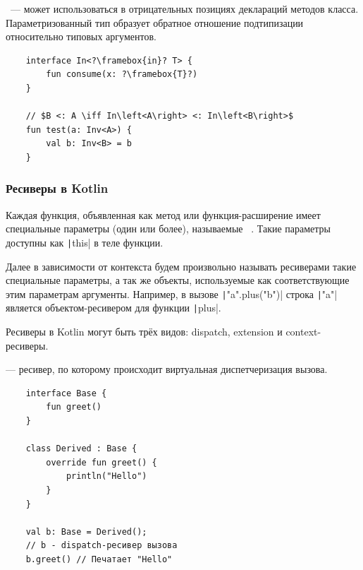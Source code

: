 \begin{definition}
    \label{def:contravariant}
    ~--- может использоваться в отрицательных позициях деклараций методов класса.
    Параметризованный тип образует обратное отношение подтипизации относительно типовых аргументов.
\end{definition}

\begin{verbatim}
    interface In<?\framebox{in}? T> {
        fun consume(x: ?\framebox{T}?)
    }

    // $B <: A \iff In\left<A\right> <: In\left<B\right>$
    fun test(a: Inv<A>) {
        val b: Inv<B> = b
    }
\end{verbatim}

\subsubsection{Ресиверы в Kotlin}

\begin{definition}
    \label{def:receivers}
    Каждая функция, объявленная как метод или функция-расширение имеет специальные параметры (один или более), называемые ~\cite{akhin2021kotlin}.
    Такие параметры доступны как \texttt|this| в теле функции.
\end{definition}

Далее в зависимости от контекста будем произвольно называть ресиверами такие специальные параметры, а так же объекты, используемые как соответствующие этим параметрам аргументы.
Например, в вызове \texttt|"a".plus("b")| строка \texttt|"a"| является объектом-ресивером для функции \texttt|plus|.

Ресиверы в Kotlin могут быть трёх видов: dispatch, extension и context-ресиверы.

\begin{definition}
    \label{def:dispatch-receivers}
     --- ресивер, по которому происходит виртуальная диспетчеризация вызова.
\end{definition}

\begin{verbatim}
    interface Base {
        fun greet()
    }

    class Derived : Base {
        override fun greet() {
            println("Hello")
        }
    }

    val b: Base = Derived();
    // b - dispatch-ресивер вызова
    b.greet() // Печатает "Hello"
\end{verbatim}

